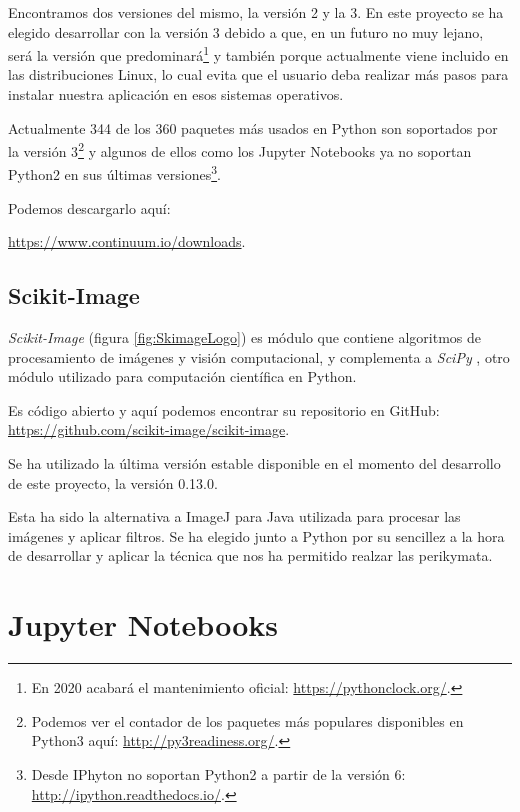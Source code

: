 Encontramos dos versiones del mismo, la versión 2 y la 3. En este proyecto se ha elegido desarrollar con la versión 3 debido a que, en un futuro no muy lejano, será la versión que predominará\footnote{En 2020 acabará el mantenimiento oficial: \url{https://pythonclock.org/}.} y también porque actualmente viene incluido en las distribuciones Linux, lo cual evita que el usuario deba realizar más pasos para instalar nuestra aplicación en esos sistemas operativos. 

Actualmente 344 de los 360 paquetes más usados en Python son soportados por la versión 3\footnote{Podemos ver el contador de los paquetes más populares disponibles en Python3 aquí: \url{http://py3readiness.org/}.} y algunos de ellos como los Jupyter Notebooks ya no soportan Python2 en sus últimas versiones\footnote{Desde IPhyton no soportan Python2 a partir de la versión 6: \url{http://ipython.readthedocs.io/}.}.


Podemos descargarlo aquí:

\url{https://www.continuum.io/downloads}.


\subsection{Scikit-Image} \label{th:Skimage}
\textit{Scikit-Image} (figura \ref{fig:SkimageLogo}) es módulo que contiene algoritmos de procesamiento de imágenes y visión computacional, y complementa a \textit{SciPy} \cite{Scipy}, otro módulo utilizado para computación científica en Python.


Es código abierto y aquí podemos encontrar su repositorio en GitHub: \\ \url{https://github.com/scikit-image/scikit-image}.

Se ha utilizado la última versión estable disponible en el momento del desarrollo de este proyecto, la versión 0.13.0.

Esta ha sido la alternativa a ImageJ \cite{ImageJ} para Java utilizada para procesar las imágenes y aplicar filtros. Se ha elegido junto a Python por su sencillez a la hora de desarrollar y aplicar la técnica que nos ha permitido realzar las perikymata.

\section{Jupyter Notebooks} \label{th:JupyterNotebooks}

